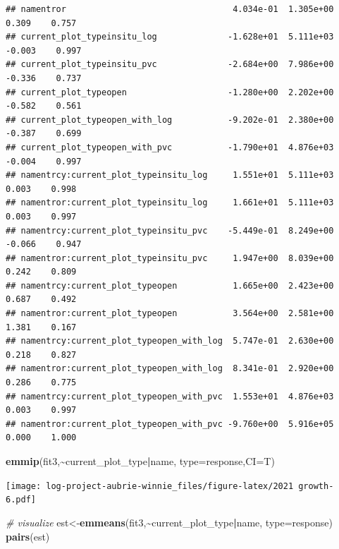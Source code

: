 \documentclass[
]{article}
\newenvironment{Shaded}{\begin{snugshade}}{\end{snugshade}}
\newcommand{\AttributeTok}[1]{\textcolor[rgb]{0.13,0.29,0.53}{#1}}
\newcommand{\CommentTok}[1]{\textcolor[rgb]{0.56,0.35,0.01}{\textit{#1}}}
\newcommand{\FunctionTok}[1]{\textcolor[rgb]{0.13,0.29,0.53}{\textbf{#1}}}
\newcommand{\NormalTok}[1]{#1}
\newcommand{\OtherTok}[1]{\textcolor[rgb]{0.56,0.35,0.01}{#1}}
\newcommand{\SpecialCharTok}[1]{\textcolor[rgb]{0.81,0.36,0.00}{\textbf{#1}}}
\newcommand{\StringTok}[1]{\textcolor[rgb]{0.31,0.60,0.02}{#1}}
\begin{document}
\begin{verbatim}
## namentror                                 4.034e-01  1.305e+00   0.309    0.757
## current_plot_typeinsitu_log              -1.628e+01  5.111e+03  -0.003    0.997
## current_plot_typeinsitu_pvc              -2.684e+00  7.986e+00  -0.336    0.737
## current_plot_typeopen                    -1.280e+00  2.202e+00  -0.582    0.561
## current_plot_typeopen_with_log           -9.202e-01  2.380e+00  -0.387    0.699
## current_plot_typeopen_with_pvc           -1.790e+01  4.876e+03  -0.004    0.997
## namentrcy:current_plot_typeinsitu_log     1.551e+01  5.111e+03   0.003    0.998
## namentror:current_plot_typeinsitu_log     1.661e+01  5.111e+03   0.003    0.997
## namentrcy:current_plot_typeinsitu_pvc    -5.449e-01  8.249e+00  -0.066    0.947
## namentror:current_plot_typeinsitu_pvc     1.947e+00  8.039e+00   0.242    0.809
## namentrcy:current_plot_typeopen           1.665e+00  2.423e+00   0.687    0.492
## namentror:current_plot_typeopen           3.564e+00  2.581e+00   1.381    0.167
## namentrcy:current_plot_typeopen_with_log  5.747e-01  2.630e+00   0.218    0.827
## namentror:current_plot_typeopen_with_log  8.341e-01  2.920e+00   0.286    0.775
## namentrcy:current_plot_typeopen_with_pvc  1.553e+01  4.876e+03   0.003    0.997
## namentror:current_plot_typeopen_with_pvc -9.760e+00  5.916e+05   0.000    1.000
\end{verbatim}

\begin{Shaded}
\begin{Highlighting}[]
\FunctionTok{emmip}\NormalTok{(fit3,}\SpecialCharTok{\textasciitilde{}}\NormalTok{current\_plot\_type}\SpecialCharTok{|}\NormalTok{name, }\AttributeTok{type=}\StringTok{\textquotesingle{}response\textquotesingle{}}\NormalTok{,}\AttributeTok{CI=}\NormalTok{T)}
\end{Highlighting}
\end{Shaded}

\texttt{[image: log-project-aubrie-winnie\_files/figure-latex/2021 growth-6.pdf]}

\begin{Shaded}
\begin{Highlighting}[]
\CommentTok{\# visualize}
\NormalTok{est}\OtherTok{\textless{}{-}}\FunctionTok{emmeans}\NormalTok{(fit3,}\SpecialCharTok{\textasciitilde{}}\NormalTok{current\_plot\_type}\SpecialCharTok{|}\NormalTok{name, }\AttributeTok{type=}\StringTok{\textquotesingle{}response\textquotesingle{}}\NormalTok{)}
\FunctionTok{pairs}\NormalTok{(est)}
\end{Highlighting}
\end{Shaded}
\end{document}
